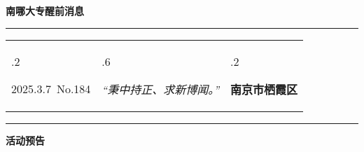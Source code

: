 \documentclass[letterpaper, 12pt]{article}
\begin{document}
\begin{center}
    \Huge\textbf{南哪大专醒前消息}
\end{center}
\vspace{4mm}
\hrule
\renewcommand\tabularxcolumn[1]{m{#1}}
\begin{tabularx}{\textwidth}{>{\hsize.2\hsize}X>{\hsize.6\hsize}X>{\hsize.2\hsize}X}
    \begin{flushleft}
        2025.3.7\, No.184
    \end{flushleft}
    &
    \begin{center}
        \textit{“秉中持正、求新博闻。”}
    \end{center}
    &
    \begin{flushright}
        \textbf{南京市栖霞区}
    \end{flushright}
\end{tabularx}
\vspace{-3.5mm}
\hrule
\vspace{4mm}
\centerline{\huge\textbf{活动预告}}
\end{document}
